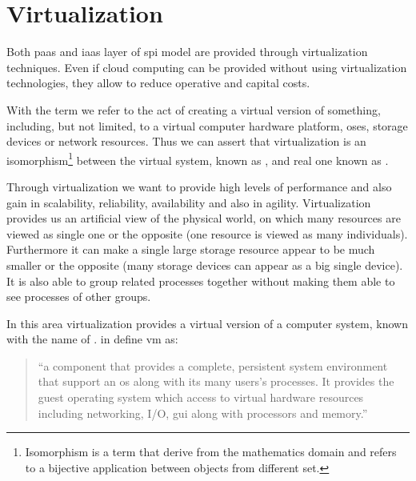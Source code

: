 %
%
\section{Virtualization}
\label{sec:background-virtualization}
Both \ac{paas} and \ac{iaas} layer of \ac{spi} model are provided through virtualization techniques.
Even if cloud computing can be provided without using virtualization technologies, they allow to
reduce operative and capital costs.

With the term  we refer to the act of creating a virtual version of something,
including, but not limited, to a virtual computer hardware platform, \acs{os}es, storage devices or
network resources. Thus we can assert that virtualization is an isomorphism\footnote{Isomorphism is
a term that derive from the mathematics	domain and refers to a bijective application between objects
from different set.} between the virtual system, known as , and real one known as
.

Through virtualization we want to provide high levels of performance and also gain in scalability,
reliability, availability and also in agility. Virtualization provides us an artificial view of the
physical world, on which many resources are viewed as single one or the opposite (one resource
is viewed as many individuals). Furthermore it can make a single large storage resource appear to be much
smaller or the opposite (many storage devices can appear as a big single device). It is also able to group
related processes together without making them able to see processes of other groups.

In this area virtualization provides a virtual version of a computer system, known with the name of
. \citeauthor{vmArchitecture} in \cite{vmArchitecture} define \ac{vm} as:

\begin{quote}
	``a component that provides a complete, persistent system environment that support an \acs{os}
	along with its many users's processes. It provides the guest operating system which access to
	virtual hardware resources including networking, I/O, \ac{gui} along with processors and memory.''
\end{quote}

